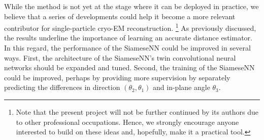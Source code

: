 While the method is not yet at the stage where it can be deployed in practice, we believe that a series of developments could help it become a more relevant contributor for single-particle cryo-EM reconstruction.%
\footnote{Note that the present project will not be further continued by its authors due to other professional occupations. Hence, we strongly encourage anyone interested to build on these ideas and, hopefully, make it a practical tool.}
As previously discussed, the results underline the importance of learning an accurate distance estimator. %
In this regard, the performance of the SiameseNN could be improved in several ways.
First, the architecture of the SiameseNN's twin convolutional neural networks should be expanded and tuned.
Second, the training of the SiameseNN could be improved, perhaps by providing more supervision by separately predicting the differences in direction $(\theta_2,\theta_1)$ and in-plane angle $\theta_3$.


